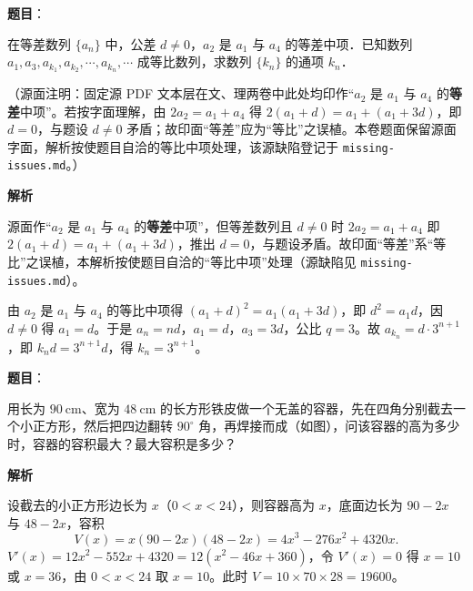 \begin{answer}

\textbf{题目}：

在等差数列 $\{a_n\}$ 中，公差 $d \neq 0$，$a_2$ 是 $a_1$ 与 $a_4$ 的等差中项．已知数列 $a_1, a_3, a_{k_1}, a_{k_2}, \cdots, a_{k_n}, \cdots$ 成等比数列，求数列 $\{k_n\}$ 的通项 $k_n$．

\begin{gktip}
（源面注明：固定源 PDF 文本层在文、理两卷中此处均印作“$a_2$ 是 $a_1$ 与 $a_4$ 的\textbf{等差}中项”。若按字面理解，由 $2a_2 = a_1 + a_4$ 得 $2(a_1+d) = a_1 + (a_1+3d)$，即 $d = 0$，与题设 $d\neq 0$ 矛盾；故印面“等差”应为“等比”之误植。本卷题面保留源面字面，解析按使题目自洽的等比中项处理，该源缺陷登记于 \texttt{missing-issues.md}。）
\end{gktip}

\textbf{解析}

源面作“$a_2$ 是 $a_1$ 与 $a_4$ 的\textbf{等差}中项”，但等差数列且 $d \neq 0$ 时 $2a_2 = a_1 + a_4$ 即 $2(a_1 + d) = a_1 + (a_1 + 3d)$，推出 $d = 0$，与题设矛盾。故印面“等差”系“等比”之误植，本解析按使题目自洽的“等比中项”处理（源缺陷见 \texttt{missing-issues.md}）。

由 $a_2$ 是 $a_1$ 与 $a_4$ 的等比中项得 $(a_1 + d)^2 = a_1(a_1 + 3d)$，即 $d^2 = a_1 d$，因 $d \neq 0$ 得 $a_1 = d$。于是 $a_n = nd$，$a_1 = d$，$a_3 = 3d$，公比 $q = 3$。故 $a_{k_n} = d \cdot 3^{n+1}$，即 $k_n d = 3^{n+1} d$，得 $k_n = 3^{n+1}$。


\end{answer}
\begin{answer}

\textbf{题目}：

用长为 $90\ \mathrm{cm}$、宽为 $48\ \mathrm{cm}$ 的长方形铁皮做一个无盖的容器，先在四角分别截去一个小正方形，然后把四边翻转 $90^\circ$ 角，再焊接而成（如图），问该容器的高为多少时，容器的容积最大？最大容积是多少？
\nopagebreak[4]
\begin{center}\end{center}
\nopagebreak[4]
\textbf{解析}

设截去的小正方形边长为 $x$（$0 < x < 24$），则容器高为 $x$，底面边长为 $90 - 2x$ 与 $48 - 2x$，容积
\nopagebreak[4]
\[
V(x) = x(90-2x)(48-2x) = 4x^3 - 276x^2 + 4320x.
\]
$V'(x) = 12x^2 - 552x + 4320 = 12\left(x^2 - 46x + 360\right)$，令 $V'(x) = 0$ 得 $x = 10$ 或 $x = 36$，由 $0 < x < 24$ 取 $x = 10$。此时 $V = 10\times 70\times 28 = 19600$。


\end{answer}
